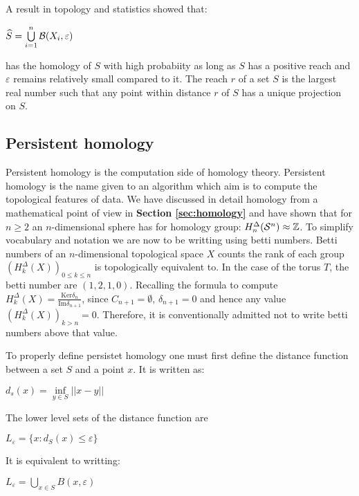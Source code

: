 \documentclass[12pt, a4paper]{article}
\begin{document}
A result in topology and statistics showed that:
\begin{center}
  $\widehat{S} = \bigcup\limits_{i=1}^{n}\mathcal{B}(X_i,\varepsilon)$
\end{center}

has the homology of $S$ with high probabiity as long as $S$ has a positive reach and $\varepsilon$ remains relatively small compared to it. The reach $r$ of a set $S$ is the largest real number such that any point within distance $r$ of $S$ has a unique projection on $S$.

\subsection{Persistent homology}

Persistent homology is the computation side of homology theory. Persistent homology is the name given to an algorithm which aim is to compute the topological features of data. We have discussed in detail homology from a mathematical point of view in \textbf{Section \ref{sec:homology}} and have shown that for $n \ge 2$ an $n$-dimensional sphere has for homology group: $H_n^\Delta(\mathcal{S}^n) \approx \mathbb{Z}$. To simplify vocabulary and notation we are now to be writting using betti numbers. Betti numbers of an $n$-dimensional topological space $X$ counts the rank of each group $(H_k^\Delta(X))_{0 \le k \le n}$ is topologically equivalent to. In the case of the torus $T$, the betti number are $(1,2,1,0)$. Recalling the formula to compute $H_k^\Delta(X) = \frac{\text{Ker} \delta_n}{\text{Im} \delta_{n+1}}$, since $C_{n+1} = \emptyset$, $\delta_{n+1} = 0$ and hence any value $(H_k^\Delta(X))_{k > n} = 0$. Therefore, it is conventionally admitted not to write betti numbers above that value. 

To properly define persistet homology one must first define the distance function between a set $S$ and a point $x$. It is written as:
\begin{center}
  $d_s(x) = \inf\limits_{y\in S} ||x-y||$  
\end{center}

The lower level sets of the distance function are

\begin{center}
  $L_\varepsilon = \lbrace x : d_S(x) \le \varepsilon \rbrace$
\end{center}

It is equivalent to writting:

\begin{center}
  $L_\varepsilon = \bigcup\limits_{x \in S} B(x,\varepsilon)$ 
\end{center}
\end{document}
